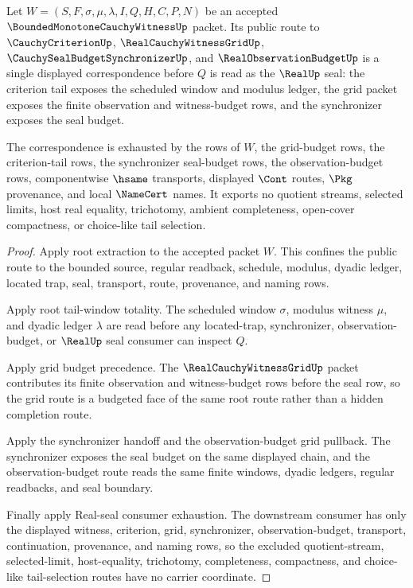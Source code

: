 \begin{theorem}
\label{thm:bounded-monotone-cauchy-witness-criterion-grid-synchronizer-correspondence}
Let $W=(S,F,\sigma,\mu,\lambda,I,Q,H,C,P,N)$ be an accepted $\BoundedMonotoneCauchyWitnessUp$ packet. Its public route to $\CauchyCriterionUp$, $\RealCauchyWitnessGridUp$, $\CauchySealBudgetSynchronizerUp$, and $\RealObservationBudgetUp$ is a single displayed correspondence before $Q$ is read as the $\RealUp$ seal: the criterion tail exposes the scheduled window and modulus ledger, the grid packet exposes the finite observation and witness-budget rows, and the synchronizer exposes the seal budget.

The correspondence is exhausted by the rows of $W$, the grid-budget rows, the criterion-tail rows, the synchronizer seal-budget rows, the observation-budget rows, componentwise $\hsame$ transports, displayed $\Cont$ routes, $\Pkg$ provenance, and local $\NameCert$ names. It exports no quotient streams, selected limits, host real equality, trichotomy, ambient completeness, open-cover compactness, or choice-like tail selection.
\end{theorem}
\begin{proof}
Apply root extraction to the accepted packet $W$. This confines the public route to the bounded source, regular readback, schedule, modulus, dyadic ledger, located trap, seal, transport, route, provenance, and naming rows.

Apply root tail-window totality. The scheduled window $\sigma$, modulus witness $\mu$, and dyadic ledger $\lambda$ are read before any located-trap, synchronizer, observation-budget, or $\RealUp$ seal consumer can inspect $Q$.

Apply grid budget precedence. The $\RealCauchyWitnessGridUp$ packet contributes its finite observation and witness-budget rows before the seal row, so the grid route is a budgeted face of the same root route rather than a hidden completion route.

Apply the synchronizer handoff and the observation-budget grid pullback. The synchronizer exposes the seal budget on the same displayed chain, and the observation-budget route reads the same finite windows, dyadic ledgers, regular readbacks, and seal boundary.

Finally apply Real-seal consumer exhaustion. The downstream consumer has only the displayed witness, criterion, grid, synchronizer, observation-budget, transport, continuation, provenance, and naming rows, so the excluded quotient-stream, selected-limit, host-equality, trichotomy, completeness, compactness, and choice-like tail-selection routes have no carrier coordinate.
\end{proof}

